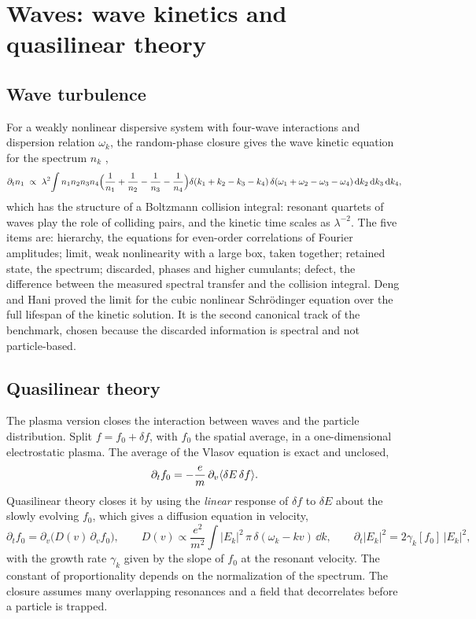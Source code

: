 \section{Waves: wave kinetics and quasilinear theory}
\label{sec:waves}

\subsection{Wave turbulence}

For a weakly nonlinear dispersive system with four-wave interactions and
dispersion relation $\omega_k$, the random-phase closure gives the wave
kinetic equation for the spectrum $n_k$ \cite{ZLF92},
\begin{equation}
  \partial_tn_1\;\propto\;\lambda^2\!\int n_1n_2n_3n_4
  \Bigl(\frac1{n_1}+\frac1{n_2}-\frac1{n_3}-\frac1{n_4}\Bigr)
  \delta(k_1+k_2-k_3-k_4)\,\delta(\omega_1+\omega_2-\omega_3-\omega_4)
  \,\mathrm{d} k_2\,\mathrm{d} k_3\,\mathrm{d} k_4 ,
\end{equation}
which has the structure of a Boltzmann collision integral: resonant
quartets of waves play the role of colliding pairs, and the kinetic time
scales as $\lambda^{-2}$. The five items are: hierarchy, the equations for
even-order correlations of Fourier amplitudes; limit, weak nonlinearity
with a large box, taken together; retained state, the spectrum; discarded,
phases and higher cumulants; defect, the difference between the measured
spectral transfer and the collision integral. Deng and Hani \cite{DH23}
proved the limit for the cubic nonlinear Schr\"odinger equation over the
full lifespan of the kinetic solution. It is the second canonical track of
the benchmark, chosen because the discarded information is spectral and
not particle-based.

\subsection{Quasilinear theory}

The plasma version closes the interaction between waves and the particle
distribution. Split $f=f_0+\delta f$, with $f_0$ the spatial average, in a
one-dimensional electrostatic plasma. The average of the Vlasov equation is
exact and unclosed,
\begin{equation}
  \partial_tf_0=-\frac{e}{m}\,\partial_v\langle \delta E\,\delta f \rangle.
\end{equation}
Quasilinear theory \cite{VVS62,DrummondPines62} closes it by using the
\emph{linear} response of $\delta f$ to $\delta E$ about the slowly
evolving $f_0$, which gives a diffusion equation in velocity,
\begin{equation}
  \partial_tf_0=\partial_v\bigl(D(v)\,\partial_vf_0\bigr),
  \qquad
  D(v)\propto\frac{e^2}{m^2}\int|E_k|^2\,\pi\,\delta(\omega_k-kv)\,\dd k,
  \qquad
  \partial_t|E_k|^2=2\gamma_k[f_0]\,|E_k|^2 ,
\end{equation}
with the growth rate $\gamma_k$ given by the slope of $f_0$ at the
resonant velocity. The constant of proportionality depends on the
normalization of the spectrum. The closure assumes many overlapping
resonances and a field that decorrelates before a particle is trapped.

